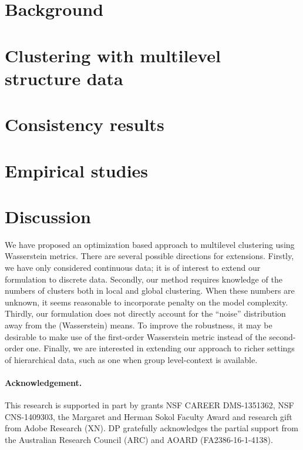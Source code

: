 \section{Background} \label{Section:prelim}



\section{Clustering with multilevel structure data} \label{Section:multilevel_Wasserstein}



\section{Consistency results} \label{Section:consistency_multilevel_Kmeans}


\section{Empirical studies} \label{Section:data_analysis}

\vspace{-6pt}
\section{Discussion} \label{Section:discussion}
We have proposed an optimization based approach to multilevel clustering 
using Wasserstein metrics. There are several possible directions for extensions.
Firstly, we have only considered continuous data; it is of interest to extend 
our formulation to discrete data. Secondly, our 
method requires knowledge of the numbers of clusters both in local and global clustering. 
When these numbers are unknown, it seems reasonable to incorporate penalty
on the model complexity. Thirdly,  our formulation does not directly account for the ``noise'' distribution away from the 
(Wasserstein) means.  To improve the robustness, it may be desirable to
make use of the first-order Wasserstein metric instead of the second-order one. 
Finally, we are interested in extending our approach to richer settings of 
hierarchical data, such as one when group level-context is available. 
\vspace{-6pt}
\paragraph{Acknowledgement.} This research is supported in part by grants
NSF CAREER DMS-1351362, NSF CNS-1409303, the Margaret and Herman Sokol 
Faculty Award and research gift from Adobe Research (XN). 
DP gratefully acknowledges the partial support from the 
Australian Research Council (ARC) and AOARD (FA2386-16-1-4138).

